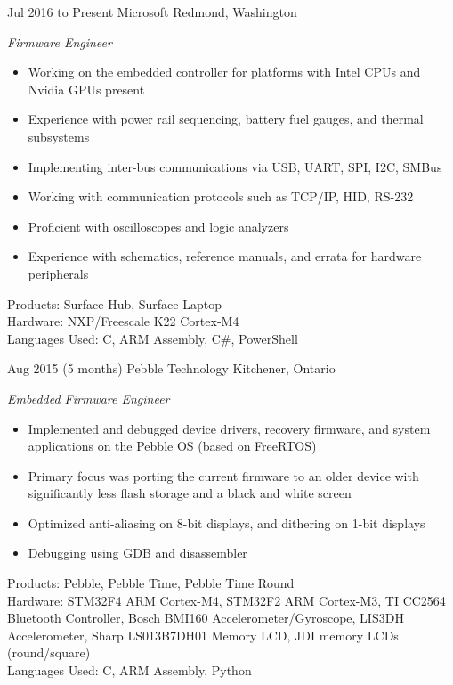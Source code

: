 \documentclass[print]{friggeri-cv} %
\begin{document}
\begin{entrylist}

\entry
{Jul 2016}
{to Present}
{Microsoft}
{Redmond, Washington}
{\emph{Firmware Engineer}
\begin{itemize}
\item Working on the embedded controller for platforms with Intel CPUs and Nvidia GPUs present
\item Experience with power rail sequencing, battery fuel gauges, and thermal subsystems
\item Implementing inter-bus communications via USB, UART, SPI, I2C, SMBus
\item Working with communication protocols such as TCP/IP, HID, RS-232
\item Proficient with oscilloscopes and logic analyzers
\item Experience with schematics, reference manuals, and errata for hardware peripherals
\end{itemize}
Products: Surface Hub, Surface Laptop \\
Hardware: NXP/Freescale K22 Cortex-M4 \\
Languages Used: C, ARM Assembly, C\#, PowerShell \\
}

\entry
{Aug 2015}
{(5 months)}
{Pebble Technology}
{Kitchener, Ontario}
{\emph{Embedded Firmware Engineer}
\begin{itemize}
\item Implemented and debugged device drivers, recovery firmware, and system applications on the Pebble OS (based on FreeRTOS)
\item Primary focus was porting the current firmware to an older device with significantly less flash storage and a black and white screen
\item Optimized anti-aliasing on 8-bit displays, and dithering on 1-bit displays
\item Debugging using GDB and disassembler 
\end{itemize}
Products: Pebble, Pebble Time, Pebble Time Round \\
Hardware: STM32F4 ARM Cortex-M4, STM32F2 ARM Cortex-M3, TI CC2564 Bluetooth Controller, Bosch BMI160 Accelerometer/Gyroscope, LIS3DH Accelerometer, Sharp LS013B7DH01 Memory LCD, JDI memory LCDs (round/square) \\
Languages Used: C, ARM Assembly, Python \\
}


\end{entrylist}
\end{document}
